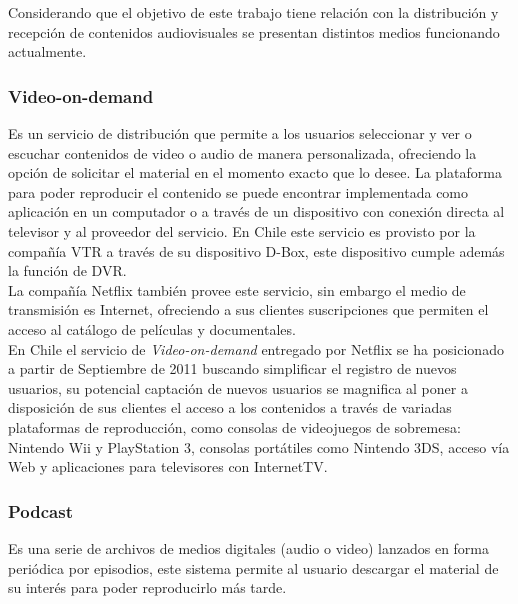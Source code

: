 Considerando que el objetivo de este trabajo tiene relación con la distribución y recepción de contenidos audiovisuales se presentan distintos medios funcionando actualmente.\\

\subsubsection{Video-on-demand}
Es un servicio de distribución que permite a los usuarios seleccionar y ver o escuchar contenidos de video o audio de manera personalizada, ofreciendo la opción de solicitar el material en el momento exacto que lo desee.  La plataforma para poder reproducir el contenido se puede encontrar implementada como aplicación en un computador o a través de un dispositivo con conexión directa al televisor y al proveedor del servicio. En Chile este servicio es provisto por la compañía VTR a través de su dispositivo D-Box, este dispositivo cumple además la función de DVR.\\

La compañía Netflix también provee este servicio, sin embargo el medio de transmisión es Internet, ofreciendo a sus clientes suscripciones que permiten el acceso al catálogo de películas y documentales.\\

En Chile el servicio de \textit{Video-on-demand} entregado por Netflix se ha posicionado a partir de Septiembre de 2011 buscando simplificar el registro de nuevos usuarios, su potencial captación de nuevos usuarios se magnifica al poner a disposición de sus clientes el acceso a los contenidos a través de variadas plataformas de reproducción, como consolas de videojuegos de sobremesa: Nintendo Wii y PlayStation 3, consolas portátiles como Nintendo 3DS, acceso vía Web y aplicaciones para televisores con InternetTV. \\

\subsubsection{Podcast}
Es una serie de archivos de medios digitales (audio o video) lanzados en forma periódica por episodios, este sistema permite al usuario descargar el material de su interés para poder reproducirlo más tarde.\\

